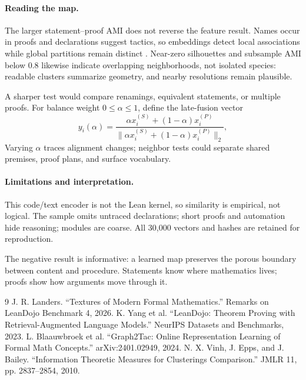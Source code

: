\documentclass[11pt]{article}
\begin{document}
\paragraph{Reading the map.}
The larger statement--proof AMI does not reverse the feature result.  Names occur in proofs and
declarations suggest tactics, so embeddings detect local associations while global partitions
remain distinct \cite{graph2tac,leandojo}.  Near-zero silhouettes and subsample AMI below $0.8$
likewise indicate overlapping neighborhoods, not isolated species: readable clusters summarize
geometry, and nearby resolutions remain plausible.

A sharper test would compare renamings, equivalent statements, or multiple proofs.  For balance
weight $0\leq\alpha\leq1$, define the late-fusion vector
\[
 y_i(\alpha)=
 \frac{\alpha x_i^{(S)}+(1-\alpha)x_i^{(P)}}
 {\lVert\alpha x_i^{(S)}+(1-\alpha)x_i^{(P)}\rVert_2},
\]
Varying $\alpha$ traces alignment changes; neighbor tests could separate shared premises, proof
plans, and surface vocabulary.

\paragraph{Limitations and interpretation.}
This code/text encoder is not the Lean kernel, so similarity is empirical, not logical.  The sample
omits untraced declarations; short proofs and automation hide reasoning; modules are coarse.  All
30,000 vectors and hashes are retained for reproduction.

The negative result is informative: a learned map preserves the porous boundary between content
and procedure.  Statements know where mathematics lives; proofs show how arguments move through it.

\begin{thebibliography}{9}\scriptsize
\setlength{\itemsep}{0pt}
 J. R. Landers. ``Textures of Modern Formal Mathematics.'' Remarks on LeanDojo Benchmark 4, 2026.
 K. Yang et al. ``LeanDojo: Theorem Proving with Retrieval-Augmented Language Models.'' NeurIPS Datasets and Benchmarks, 2023.
 L. Blaauwbroek et al. ``Graph2Tac: Online Representation Learning of Formal Math Concepts.'' arXiv:2401.02949, 2024.
 N. X. Vinh, J. Epps, and J. Bailey. ``Information Theoretic Measures for Clusterings Comparison.'' JMLR 11, pp. 2837--2854, 2010.
\end{thebibliography}
\end{document}
